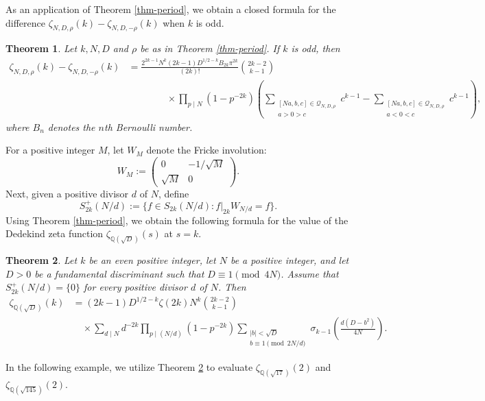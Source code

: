\documentclass[12pt]{amsart}
\numberwithin{equation}{section}
\newtheorem{theorem}{Theorem}[section]
\theoremstyle{definition}
\begin{document}
As an application of Theorem \ref{thm-period}, we obtain a closed formula for the difference $\zeta_{N,D,\rho}(k)-\zeta_{N,D,-\rho}(k)$ when $k$ is odd.

\begin{theorem}\label{thm-zetaformula}
    Let $k,N,D$ and $\rho$ be as in Theorem \ref{thm-period}. If $k$ is odd, then
    \begin{align*}
        \zeta_{N,D,\rho}(k)-\zeta_{N,D,-\rho}(k)&=\frac{2^{2k-1}N^{k}(2k-1)D^{1/2-k}B_{2k}\pi^{2k}}{(2k)!}\binom{2k-2}{k-1}\\
        &\qquad\qquad\times\prod_{p\mid N}(1-p^{-2k})\left(\sum\limits_{\substack{[Na,b,c]\in\mathcal{Q}_{N,D,\rho} \\ a>0>c}}c^{k-1}-\sum\limits_{\substack{[Na,b,c]\in\mathcal{Q}_{N,D,\rho} \\ a<0<c}}c^{k-1}\right),
    \end{align*}
    where $B_{n}$ denotes the $n$th Bernoulli number.
\end{theorem}

For a positive integer $M$, let $W_{M}$ denote the Fricke involution:
$$W_{M}:=\left(\begin{smallmatrix}
    0 & -1/\sqrt{M} \\ \sqrt{M} & 0
\end{smallmatrix}\right).$$
Next, given a positive divisor $d$ of $N$, define
$$S_{2k}^{+}(N/d):=\{f\in S_{2k}(N/d):f|_{2k}W_{N/d}=f\}.$$
Using Theorem \ref{thm-period}, we obtain the following formula for the value of the Dedekind zeta function $\zeta_{\mathbb{Q}(\sqrt{D})}(s)$ at $s=k$.

\begin{theorem}\label{thm-dedekindzeta}
    Let $k$ be an even positive integer, let $N$ be a positive integer, and let $D>0$ be a fundamental discriminant such that $D\equiv 1\pmod{4N}$. Assume that $S_{2k}^{+}(N/d)=\{0\}$ for every positive divisor $d$ of $N$.
    Then
    \begin{align*}
        \zeta_{\mathbb{Q}(\sqrt{D})}(k)&=(2k-1)D^{1/2-k}\zeta(2k)N^{k}\binom{2k-2}{k-1}\\
        &\quad\times\sum_{d\mid N}d^{-2k}\prod_{p\mid(N/d)}(1-p^{-2k})\sum\limits_{\substack{|b|<\sqrt{D} \\ b\equiv 1\pmod{2N/d}}}\sigma_{k-1}\left(\frac{d(D-b^{2})}{4N}\right).
    \end{align*}
\end{theorem}

In the following example, we utilize Theorem \ref{thm-dedekindzeta} to evaluate $\zeta_{\mathbb{Q}(\sqrt{17})}(2)$ and $\zeta_{\mathbb{Q}(\sqrt{145})}(2)$.
\end{document}
